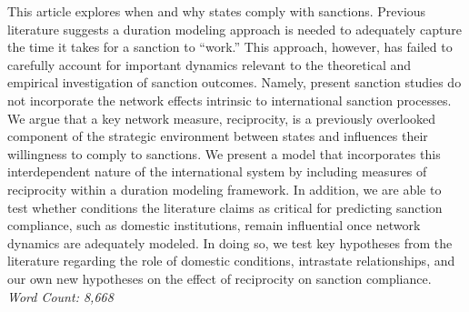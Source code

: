 This article explores when and why states comply with sanctions. Previous literature suggests a duration modeling approach is needed to adequately capture the time it takes for a sanction to ``work.'' This approach, however, has failed to carefully account for important dynamics relevant to the theoretical and empirical investigation of sanction outcomes. Namely, present sanction studies do not incorporate the network effects intrinsic to international sanction processes. We argue that a key network measure, reciprocity, is a previously overlooked component of the strategic environment between states and influences their willingness to comply to sanctions. We present a model that incorporates this interdependent nature of the international system by including measures of reciprocity within a duration modeling framework. In addition, we are able to test whether conditions the literature claims as critical for predicting sanction compliance, such as domestic institutions, remain influential once network dynamics are adequately modeled. In doing so, we test key hypotheses from the literature regarding the role of domestic conditions, intrastate relationships, and our own new hypotheses on the effect of reciprocity on sanction compliance. \\

\noindent \textit{Word Count: 8,668}
